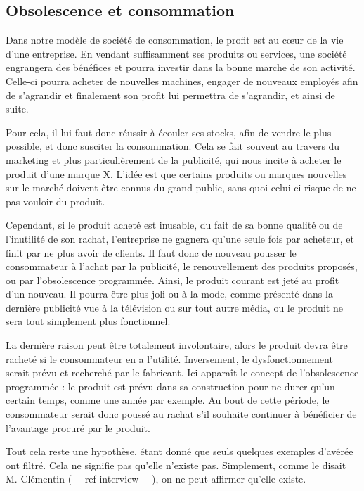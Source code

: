 \subsection{Obsolescence et consommation}

Dans notre modèle de société de consommation, le profit est au cœur de la vie d'une entreprise. En vendant suffisamment ses produits ou services, une société engrangera des bénéfices et pourra investir dans la bonne marche de son activité. Celle-ci pourra acheter de nouvelles machines, engager de nouveaux employés afin de s'agrandir et finalement son profit lui permettra de s'agrandir, et ainsi de suite.

Pour cela, il lui faut donc réussir à écouler ses stocks, afin de vendre le plus possible, et donc susciter la consommation. Cela se fait souvent au travers du marketing et plus particulièrement de la publicité, qui nous incite à acheter le produit d'une marque X. L'idée est que certains produits ou marques nouvelles sur le marché doivent être connus du grand public, sans quoi celui-ci risque de ne pas vouloir du produit.

\bigbreak
Cependant, si le produit acheté est inusable, du fait de sa bonne qualité ou de l'inutilité de son rachat, l'entreprise ne gagnera qu'une seule fois par acheteur, et finit par ne plus avoir de clients. Il faut donc de nouveau pousser le consommateur à l'achat par la publicité, le renouvellement des produits proposés, ou par l'obsolescence programmée. Ainsi, le produit courant est jeté au profit d'un nouveau. Il pourra être plus joli ou à la mode, comme présenté dans la dernière publicité vue à la télévision ou sur tout autre média, ou le produit ne sera  tout simplement plus fonctionnel. 

La dernière raison peut être totalement involontaire, alors le produit devra être racheté si le consommateur en a l'utilité. Inversement, le dysfonctionnement serait prévu et recherché par le fabricant. Ici apparaît le concept de l'obsolescence programmée : le produit est prévu dans sa construction pour ne durer qu'un certain temps, comme une année par exemple. Au bout de cette période, le consommateur serait donc poussé au rachat s'il souhaite continuer à bénéficier de l'avantage procuré par le produit.

Tout cela reste une hypothèse, étant donné que seuls quelques exemples d'\op avérée ont filtré. Cela ne signifie pas qu'elle n'existe pas. Simplement, comme le disait M. Clémentin (----ref interview----), on ne peut affirmer qu'elle existe.

